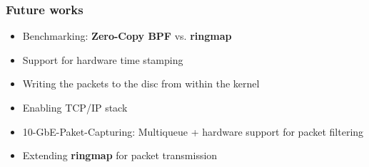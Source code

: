 \begin{frame}
\frametitle{Future works}
\begin{itemize}
	\item Benchmarking:  \textbf{Zero-Copy BPF} vs. \textbf{ringmap}
	\item Support for hardware time stamping
	\item Writing the packets to the disc from within the kernel
	\item Enabling TCP/IP stack
	\item 10-GbE-Paket-Capturing: Multiqueue + hardware support for packet filtering 
	\item Extending \textbf{ringmap} for packet transmission 
\end{itemize}
\end{frame}
